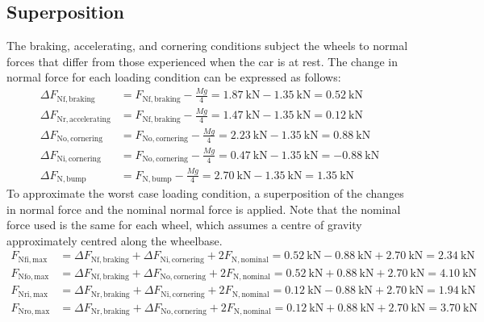 \documentclass[10pt]{article}
\begin{document}
\subsection{Superposition}
The braking, accelerating, and cornering conditions subject the wheels to normal forces that differ from those experienced when the car is at rest. The change in normal force for each loading condition can be expressed as follows: 
\begin{align}
\Delta F_\mathrm{Nf,braking}      &= F_\mathrm{Nf,braking}   - \frac{Mg}{4} =  \SI{1.87}{\kilo\newton} - \SI{1.35}{\kilo\newton} =  \SI{0.52}{\kilo\newton} \\
\Delta F_\mathrm{Nr,accelerating} &= F_\mathrm{Nf,braking}   - \frac{Mg}{4} =  \SI{1.47}{\kilo\newton} - \SI{1.35}{\kilo\newton} =  \SI{0.12}{\kilo\newton} \\
\Delta F_\mathrm{No,cornering}    &= F_\mathrm{No,cornering} - \frac{Mg}{4} =  \SI{2.23}{\kilo\newton} - \SI{1.35}{\kilo\newton} =  \SI{0.88}{\kilo\newton} \\
\Delta F_\mathrm{Ni,cornering}    &= F_\mathrm{No,cornering} - \frac{Mg}{4} =  \SI{0.47}{\kilo\newton} - \SI{1.35}{\kilo\newton} = -\SI{0.88}{\kilo\newton} \\
\Delta F_\mathrm{N,bump}          &= F_\mathrm{N,bump}       - \frac{Mg}{4} =  \SI{2.70}{\kilo\newton} - \SI{1.35}{\kilo\newton} =  \SI{1.35}{\kilo\newton}
\end{align}
To approximate the worst case loading condition, a superposition of the changes in normal force and the nominal normal force is applied. Note that the nominal force used is the same for each wheel, which assumes a centre of gravity approximately centred along the wheelbase.
\begin{align}
F_\mathrm{Nfi,max} &= \Delta F_\mathrm{Nf,braking} + \Delta F_\mathrm{Ni,cornering} + 2F_\mathrm{N,nominal} = \SI{0.52}{\kilo\newton} - \SI{0.88}{\kilo\newton} + \SI{2.70}{\kilo\newton} = \SI{2.34}{\kilo\newton} \\
F_\mathrm{Nfo,max} &= \Delta F_\mathrm{Nf,braking} + \Delta F_\mathrm{No,cornering} + 2F_\mathrm{N,nominal} = \SI{0.52}{\kilo\newton} + \SI{0.88}{\kilo\newton} + \SI{2.70}{\kilo\newton} = \SI{4.10}{\kilo\newton} \\
F_\mathrm{Nri,max} &= \Delta F_\mathrm{Nr,braking} + \Delta F_\mathrm{Ni,cornering} + 2F_\mathrm{N,nominal} = \SI{0.12}{\kilo\newton} - \SI{0.88}{\kilo\newton} + \SI{2.70}{\kilo\newton} = \SI{1.94}{\kilo\newton} \\
F_\mathrm{Nro,max} &= \Delta F_\mathrm{Nr,braking} + \Delta F_\mathrm{No,cornering} + 2F_\mathrm{N,nominal} = \SI{0.12}{\kilo\newton} + \SI{0.88}{\kilo\newton} + \SI{2.70}{\kilo\newton} = \SI{3.70}{\kilo\newton} 
\end{align}
\end{document}
